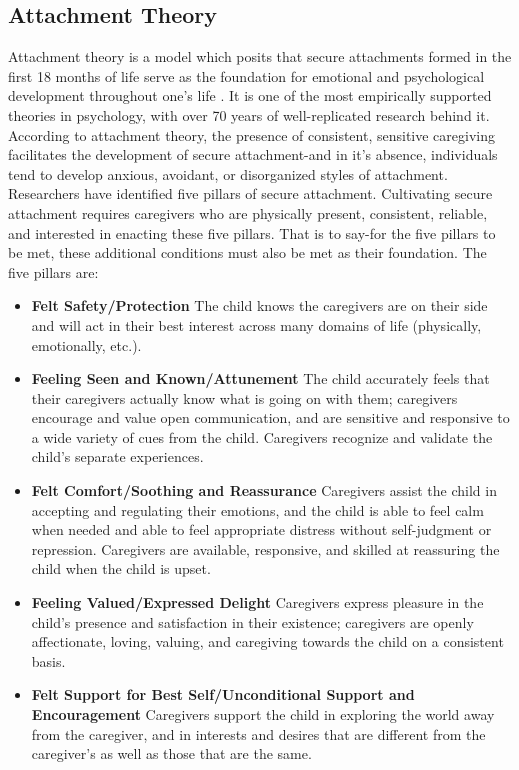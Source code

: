 \documentclass[12pt,letterpaper]{article}
\begin{document}
\subsection{Attachment Theory}
\label{attachment}
Attachment theory is a model which posits that secure attachments formed in the first 18 months of life serve as the foundation for emotional and psychological development throughout one's life \cite{brownAttachmentDisturbances}. It is one of the most empirically supported theories in psychology, with over 70 years of well-replicated research behind it. According to attachment theory, the presence of consistent, sensitive caregiving facilitates the development of secure attachment-and in it's absence, individuals tend to develop anxious, avoidant, or disorganized styles of attachment. Researchers have identified five pillars of secure attachment. Cultivating secure attachment requires caregivers who are physically present, consistent, reliable, and interested in enacting these five pillars. That is to say-for the five pillars to be met, these additional conditions must also be met as their foundation. The five pillars are:

\begin{itemize}
    \item \textbf{Felt Safety/Protection} The child knows the caregivers are on their side and will act in their best interest across many domains of life (physically, emotionally, etc.).
    \item \textbf{Feeling Seen and Known/Attunement} The child accurately feels that their caregivers actually know what is going on with them; caregivers encourage and value open communication, and are sensitive and responsive to a wide variety of cues from the child. Caregivers recognize and validate the child's separate experiences.
    \item \textbf{Felt Comfort/Soothing and Reassurance} Caregivers assist the child in accepting and regulating their emotions, and the child is able to feel calm when needed and able to feel appropriate distress without self-judgment or repression. Caregivers are available, responsive, and skilled at reassuring the child when the child is upset.
    \item \textbf{Feeling Valued/Expressed Delight} Caregivers express pleasure in the child's presence and satisfaction in their existence; caregivers are openly affectionate, loving, valuing, and caregiving towards the child on a consistent basis.
    \item \textbf{Felt Support for Best Self/Unconditional Support and Encouragement} Caregivers support the child in exploring the world away from the caregiver, and in interests and desires that are different from the caregiver's as well as those that are the same.
\end{itemize}
\end{document}
